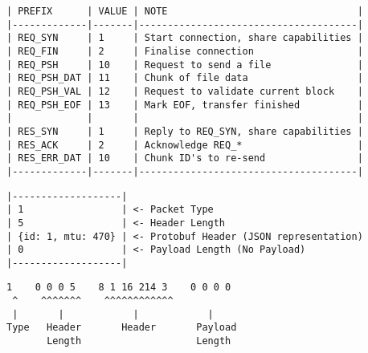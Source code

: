 \FloatBarrier

\begin{lstlisting}[float,caption={Prototype Three Packet Types},label=p3d-packet-types]
| PREFIX 	  | VALUE | NOTE                                 |
|-------------|-------|--------------------------------------|
| REQ_SYN     | 1     | Start connection, share capabilities |
| REQ_FIN 	  | 2     | Finalise connection                  |
| REQ_PSH     | 10    | Request to send a file               |
| REQ_PSH_DAT | 11    | Chunk of file data                   |
| REQ_PSH_VAL | 12    | Request to validate current block    |
| REQ_PSH_EOF | 13    | Mark EOF, transfer finished          |
|             |       |                                      |
| RES_SYN     | 1     | Reply to REQ_SYN, share capabilities |
| RES_ACK     | 2     | Acknowledge REQ_*                    |
| RES_ERR_DAT | 10    | Chunk ID's to re-send                |
|-------------|-------|--------------------------------------|
\end{lstlisting}

\begin{lstlisting}[float,caption={Prototype Three Example Packet Structure},label=p3d-example-structure]
|-------------------|
| 1                 | <- Packet Type
| 5                 | <- Header Length
| {id: 1, mtu: 470} | <- Protobuf Header (JSON representation)
| 0                 | <- Payload Length (No Payload)
|-------------------|
\end{lstlisting}

\begin{lstlisting}[float,caption={Prototype Three Example Packet Binary},label=p3d-example-binary]
 1    0 0 0 5    8 1 16 214 3    0 0 0 0
 ^    ^^^^^^^    ^^^^^^^^^^^^
 |       |            |            |
Type   Header       Header       Payload
       Length                    Length
\end{lstlisting}
